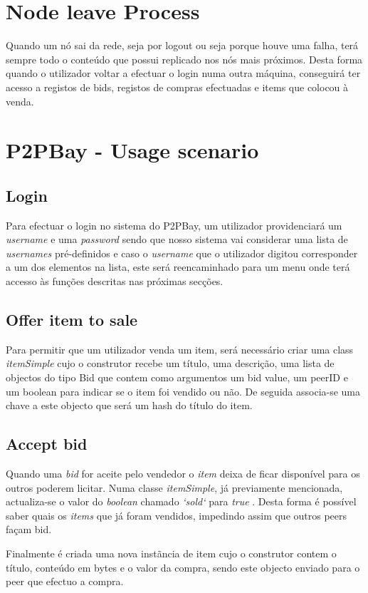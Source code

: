 \documentclass[paper=a4, fontsize=11pt]{scrartcl}
\numberwithin{equation}{section}    %
\numberwithin{figure}{section}      %
\numberwithin{table}{section}       %
\begin{document}
\section{Node leave Process}
Quando um nó sai da rede, seja por logout ou seja porque houve uma falha, terá sempre todo o conteúdo que possui replicado nos nós mais próximos. Desta forma quando o utilizador voltar a efectuar o login numa outra máquina, conseguirá ter acesso a registos de bids, registos de compras efectuadas e items que colocou à venda. 

\section{P2PBay - Usage scenario}

\subsection{Login}

Para efectuar o login no sistema do P2PBay, um utilizador providenciará um \textit{username} e uma \textit{password} sendo que nosso sistema vai considerar uma lista de \textit{usernames} pré-definidos e caso o \textit{username} que o utilizador digitou corresponder a um dos elementos na lista, este será reencaminhado para um menu onde terá accesso às funções descritas nas próximas secções.


\subsection{Offer item to sale}
Para permitir que um utilizador venda um item, será necessário criar uma class \textit{itemSimple} cujo o construtor recebe um título, uma descrição, uma lista de objectos do tipo Bid que contem como argumentos um bid value, um peerID e um boolean para indicar se o item foi vendido ou não. De seguida associa-se uma chave a este objecto que será um hash do título do item.



\subsection{Accept bid}
Quando uma \textit{bid} for aceite pelo vendedor o \textit{item} deixa de ficar disponível para os outros poderem licitar. Numa classe \textit{itemSimple}, já previamente mencionada, actualiza-se o valor do \textit{boolean} chamado \textit{`sold`} para \textit{true} . Desta forma é possível saber quais os \textit{items} que já foram vendidos, impedindo assim que  outros peers façam bid.\par Finalmente é criada uma nova instãncia de item cujo o construtor contem o título, conteúdo em bytes e o valor da compra, sendo este objecto enviado para o peer que efectuo a compra. 
\end{document}
